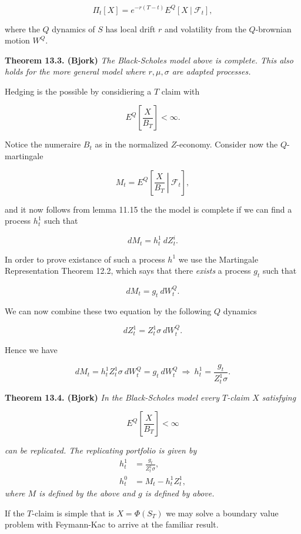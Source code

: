 \documentclass[a4paper,10pt,openany]{book}
\begin{document}
\[
\Pi_t[X]=e^{-r(T-t)}E^Q[X\ \vert\ \mathcal{F}_t],\tag{13.7}
\]

where the \(Q\) dynamics of \(S\) has local drift \(r\) and volatility from the \(Q\)-brownian motion \(W^Q\).

\textbf{Theorem 13.3. (Bjork)} \emph{The Black-Scholes model above is complete. This also holds for the more general model where \(r,\mu,\sigma\) are adapted processes.}

Hedging is the possible by considiering a \(T\) claim with

\[
E^Q\left[\frac{X}{B_T}\right]<\infty.
\]

Notice the numeraire \(B_t\) as in the normalized \(Z\)-economy. Consider now the \(Q\)-martingale

\[
M_t=E^Q\left[\left. \frac{X}{B_T}\ \right\vert\ \mathcal{F}_t\right],\tag{13.9}
\]

and it now follows from lemma 11.15 the the model is complete if we can find a process \(h_t^1\) such that

\[
dM_t=h_t^1\ dZ_t^i.\tag{13.10}
\]

In order to prove existance of such a process \(h^1\) we use the Martingale Representation Theorem 12.2, which says that there \emph{exists} a process \(g_t\) such that

\[
dM_t=g_t\ dW_t^Q.\tag{13.11}
\]

We can now combine these two equation by the following \(Q\) dynamics

\[
dZ_t^1=Z_t^1\sigma\ dW_t^Q.\tag{13.12}
\]

Hence we have

\[
dM_t=h_t^1Z_t^1\sigma\ dW_t^Q=g_t\ dW_t^Q\ \Rightarrow\ h_t^1=\frac{g_t}{Z_t^1\sigma}.
\]

\textbf{Theorem 13.4. (Bjork)} \emph{In the Black-Scholes model every \(T\)-claim \(X\) satisfying}

\[
E^Q\left[\frac{X}{B_T}\right]<\infty
\]

\emph{can be replicated. The replicating portfolio is given by}
\begin{align*}
h_t^1&=\frac{g_t}{Z_t^1\sigma},\tag{13.13}\\
h_t^0&=M_t-h_t^1Z_t^1,\tag{13.14}
\end{align*}
\emph{where \(M\) is defined by the above and \(g\) is defined by above.}

If the \(T\)-claim is simple that is \(X=\Phi(S_T)\) we may solve a boundary value problem with Feymann-Kac to arrive at the familiar result.
\end{document}
